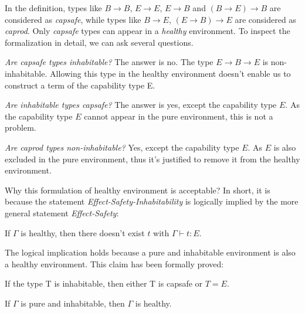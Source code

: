 In the definition, types like $B \to B$, $E \to E$, $E \to B$ and
$(B \to E) \to B$ are considered as \emph{capsafe}, while types like
$B \to E$, $(E \to B) \to E$ are considered as \emph{caprod}. Only
\emph{capsafe} types can appear in a \emph{healthy} environment. To
inspect the formalization in detail, we can ask several questions.

\emph{Are capsafe types inhabitable?} The answer is no. The type
$E \to B \to E$ is non-inhabitable. Allowing this type in the healthy
environment doesn't enable us to construct a term of the capability
type E.

\emph{Are inhabitable types capsafe?} The answer is yes, except the
capability type $E$. As the capability type $E$ cannot appear in the
pure environment, this is not a problem.

\emph{Are caprod types non-inhabitable?} Yes, except the capability
type $E$. As $E$ is also excluded in the pure environment, thus it's
justified to remove it from the healthy environment.


Why this formulation of healthy environment is acceptable? In short,
it is because the statement \emph{Effect-Safety-Inhabitability} is
logically implied by the more general statement \emph{Effect-Safety}:

\begin{definition}
  If $\Gamma$ is healthy, then there doesn't exist $t$ with
  $\Gamma \vdash t : E$.
\end{definition}

The logical implication holds because a pure and inhabitable
environment is also a healthy environment. This claim has been
formally proved:

\begin{lemma}
  If the type T is inhabitable, then either T is capsafe or $T = E$.
\end{lemma}

\begin{theorem}
  If $\Gamma$ is pure and inhabitable, then $\Gamma$ is healthy.
\end{theorem}

